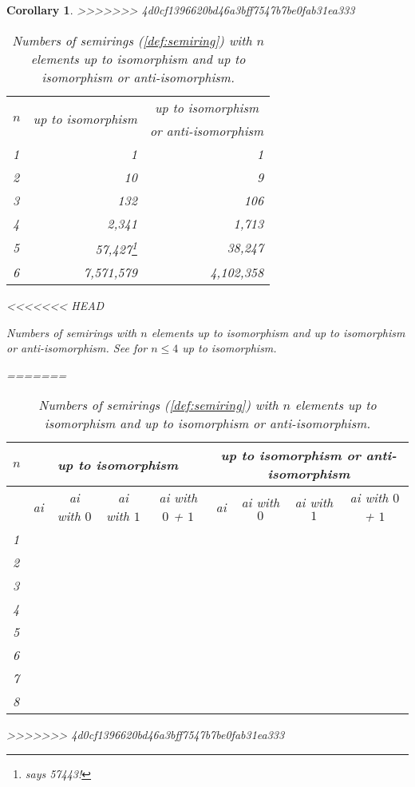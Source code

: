 \documentclass{article}
\theoremstyle{definition}
\theoremstyle{plain}
\newtheorem{cor}[defn]{Corollary}
\begin{document}
\begin{cor}
>>>>>>> 4d0cf1396620bd46a3bff7547b7be0fab31ea333
\begin{table}[ht]
  \centering
  \begin{tabular}{l|r|r}
    \multirow{2}{*}{$n$} & \multicolumn{1}{|c|}{\multirow{2}{*}{up to
    isomorphism}} & \multicolumn{1}{c}{up to isomorphism} \\
    & & \multicolumn{1}{l}{or anti-isomorphism}\\
    \midrule
    1 & 1                    & 1         \\
    2 & 10                   & 9         \\
    3 & 132                  & 106       \\
    4 & 2,341                & 1,713     \\
    5 & 57,427\footnote{\cite{baueralg} says 57443!}     & 38,247    \\
    6 & 7,571,579  & 4,102,358
  \end{tabular}
<<<<<<< HEAD
  \caption{Numbers of semirings with $n$ elements up to isomorphism and up
    to isomorphism or anti-isomorphism. See \cite{MSsemirings} for \(n\leq4\) up to isomorphism.}
=======
  \caption{Numbers of semirings (\cref{def:semiring}) with $n$ elements up to
  isomorphism and up to isomorphism or anti-isomorphism.}\label{tab:semirings}
\end{table}


\begin{table}[ht]
  \centering
  \begin{tabular}{l|r|r|r|r|r|r|r|r}
    $n$
    & \multicolumn{4}{c|}{up to isomorphism}
    & \multicolumn{4}{c}{up to isomorphism or anti-isomorphism} \\
    \midrule
    & \multicolumn{1}{c|}{ai} & \multicolumn{1}{c|}{ai with $0$}
    & \multicolumn{1}{c|}{ai with $1$} & \multicolumn{1}{c|}{ai with $0$ + $1$}
    & \multicolumn{1}{c|}{ai} & \multicolumn{1}{c}{ai with $0$}
    & \multicolumn{1}{c|}{ai with $1$} & \multicolumn{1}{c|}{ai with $0$ + $1$}
    \\
    \midrule
    1 &              &          &&&          &       \\
    2 &              &          &&&          &       \\
    3 &             &         &&&          &       \\
    4 &            &        &&&         & \\
    5 &         &      &&&        & \\
    6 &        &    &&&      & \\
    7 &      &  &&&     & \\
    8 & & &&&    & \\
  \end{tabular}
  \caption{Numbers of semirings (\cref{def:semiring}) with $n$ elements up to
  isomorphism and up to isomorphism or anti-isomorphism.}\label{tab:semirings}
>>>>>>> 4d0cf1396620bd46a3bff7547b7be0fab31ea333
  \label{tab:semirings}
\end{table}


\end{cor}
\end{document}
